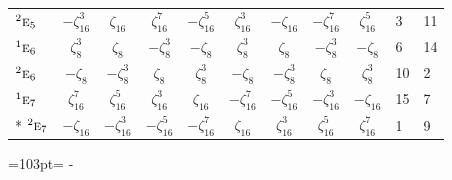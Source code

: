 \documentclass[10pt,a4paper]{article}
\newcommand{\needspace}[1]{\par\penalty-100\begingroup\dimen0=#1\relax\dimen2=\pagegoal
  \advance\dimen2-\pagetotal\ifdim\dimen0>\dimen2\relax\ifdim\dimen2>0pt\vfil\break\fi\fi
  \endgroup}
\numberwithin{equation}{section}
\newcommand{\irr}[1]{\text{\normalfont\scshape #1}}
\newcommand{\conjpair}[1]{{}^{#1}}
\newcommand{\rootunity}[1]{\zeta_{#1}}
\begin{document}
{\begin{longtable}{@{}lccccccccll@{}}
$\conjpair{2}\irr{e}_{5}$ & $-\rootunity{16}^{3}$ & $\rootunity{16}$ & $\rootunity{16}^{7}$ & $-\rootunity{16}^{5}$ & $\rootunity{16}^{3}$ & $-\rootunity{16}$ & $-\rootunity{16}^{7}$ & $\rootunity{16}^{5}$ & 3 & 11\\
$\conjpair{1}\irr{e}_{6}$ & $\rootunity{8}^{3}$ & $\rootunity{8}$ & $-\rootunity{8}^{3}$ & $-\rootunity{8}$ & $\rootunity{8}^{3}$ & $\rootunity{8}$ & $-\rootunity{8}^{3}$ & $-\rootunity{8}$ & 6 & 14\\
$\conjpair{2}\irr{e}_{6}$ & $-\rootunity{8}$ & $-\rootunity{8}^{3}$ & $\rootunity{8}$ & $\rootunity{8}^{3}$ & $-\rootunity{8}$ & $-\rootunity{8}^{3}$ & $\rootunity{8}$ & $\rootunity{8}^{3}$ & 10 & 2\\
$\conjpair{1}\irr{e}_{7}$ & $\rootunity{16}^{7}$ & $\rootunity{16}^{5}$ & $\rootunity{16}^{3}$ & $\rootunity{16}$ & $-\rootunity{16}^{7}$ & $-\rootunity{16}^{5}$ & $-\rootunity{16}^{3}$ & $-\rootunity{16}$ & 15 & 7\\*
$\conjpair{2}\irr{e}_{7}$ & $-\rootunity{16}$ & $-\rootunity{16}^{3}$ & $-\rootunity{16}^{5}$ & $-\rootunity{16}^{7}$ & $\rootunity{16}$ & $\rootunity{16}^{3}$ & $\rootunity{16}^{5}$ & $\rootunity{16}^{7}$ & 1 & 9\\
\bottomrule\end{longtable}}
\needspace{103pt}
\end{document}
